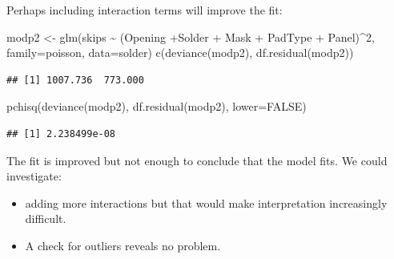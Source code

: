 \documentclass[
  ignorenonframetext,
]{beamer}
\newenvironment{Shaded}{\begin{snugshade}}{\end{snugshade}}
\newcommand{\AttributeTok}[1]{\textcolor[rgb]{0.77,0.63,0.00}{#1}}
\newcommand{\ConstantTok}[1]{\textcolor[rgb]{0.00,0.00,0.00}{#1}}
\newcommand{\DecValTok}[1]{\textcolor[rgb]{0.00,0.00,0.81}{#1}}
\newcommand{\FunctionTok}[1]{\textcolor[rgb]{0.00,0.00,0.00}{#1}}
\newcommand{\NormalTok}[1]{#1}
\newcommand{\OtherTok}[1]{\textcolor[rgb]{0.56,0.35,0.01}{#1}}
\newcommand{\SpecialCharTok}[1]{\textcolor[rgb]{0.00,0.00,0.00}{#1}}
\providecommand{\tightlist}{%
  \setlength{\itemsep}{0pt}\setlength{\parskip}{0pt}}
\begin{document}
\begin{frame}[fragile]{}
\protect\hypertarget{section-24}{}
Perhaps including interaction terms will improve the fit:

\vspace{12pt}
\tiny

\begin{Shaded}
\begin{Highlighting}[]
\NormalTok{modp2 }\OtherTok{\textless{}{-}} \FunctionTok{glm}\NormalTok{(skips }\SpecialCharTok{\textasciitilde{}}\NormalTok{ (Opening }\SpecialCharTok{+}\NormalTok{Solder }\SpecialCharTok{+}\NormalTok{ Mask }\SpecialCharTok{+}\NormalTok{ PadType }\SpecialCharTok{+}\NormalTok{ Panel)}\SpecialCharTok{\^{}}\DecValTok{2}\NormalTok{, }
             \AttributeTok{family=}\NormalTok{poisson, }\AttributeTok{data=}\NormalTok{solder)}
\FunctionTok{c}\NormalTok{(}\FunctionTok{deviance}\NormalTok{(modp2), }\FunctionTok{df.residual}\NormalTok{(modp2))}
\end{Highlighting}
\end{Shaded}

\begin{verbatim}
## [1] 1007.736  773.000
\end{verbatim}

\begin{Shaded}
\begin{Highlighting}[]
\FunctionTok{pchisq}\NormalTok{(}\FunctionTok{deviance}\NormalTok{(modp2), }\FunctionTok{df.residual}\NormalTok{(modp2), }\AttributeTok{lower=}\ConstantTok{FALSE}\NormalTok{)}
\end{Highlighting}
\end{Shaded}

\begin{verbatim}
## [1] 2.238499e-08
\end{verbatim}

\vspace{12pt}
\normalsize

The fit is improved but not enough to conclude that the model fits. We
could investigate:

\begin{itemize}
\tightlist
\item
  adding more interactions but that would make interpretation
  increasingly difficult.
\item
  A check for outliers reveals no problem.
\end{itemize}
\end{frame}
\end{document}
